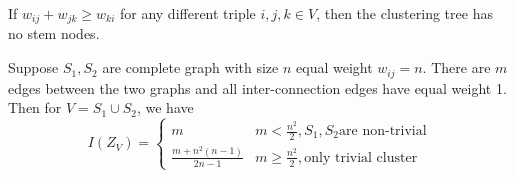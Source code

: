 \documentclass[portrait,final,a0paper,fontscale=0.3]{baposter}
\begin{document}
\begin{poster}
{\begin{multicols}{2}
If $w_{ij} + w_{jk} \geq w_{ki}$ for any different triple $i, j, k \in V$, then the clustering tree has no stem nodes.

Suppose $S_1, S_2 $ are complete graph with size $n$ equal weight $w_{ij}=n$. There are $m$ edges between the two graphs and all inter-connection edges have equal weight 1. Then for $V=S_1\cup S_2$, we have
\begin{equation*}
	I(Z_V) = \begin{cases}
		m & m <\frac{n^2}{2}, S_1,S_2 \textrm{are non-trivial} \\
		\frac{m+n^2(n-1)}{2n-1} & m\geq \frac{n^2}{2}, \textrm{only trivial cluster} 
	\end{cases}
\end{equation*}
	\end{multicols}
}

\end{poster}
\end{document}
